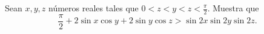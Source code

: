 Sean $x,y,z$ números reales tales que $0\lt z\lt y\lt z\lt\frac\pi2$. Muestra que
\[\frac\pi2+2\sin x\cos y+2\sin y\cos z\gt\sin2x\sin2y\sin2z.\]
